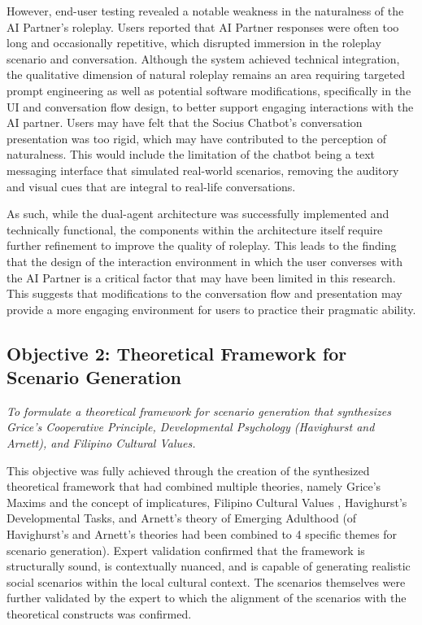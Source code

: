 However, end-user testing revealed a notable weakness in the naturalness of the
AI Partner's roleplay. Users reported that AI Partner responses were often too long
and occasionally repetitive, which disrupted immersion in the roleplay scenario and conversation. Although
the system achieved technical integration, the qualitative dimension of natural roleplay remains an 
area requiring targeted prompt engineering as well as potential software modifications, specifically in the UI and 
conversation flow design, to better support engaging interactions with the AI partner. Users may have felt that the Socius Chatbot's 
conversation presentation was too rigid, which may have contributed to the perception of naturalness. This would include the limitation of the chatbot being
a text messaging interface that simulated real-world scenarios, removing the auditory and visual cues that are integral to real-life conversations.

As such, while the dual-agent architecture was successfully implemented and technically functional, the components within the architecture itself require further refinement
to improve the quality of roleplay. This leads to the finding that the design of the interaction environment in which the user converses with the AI Partner is a critical factor that may have been limited
in this research. This suggests that modifications to the conversation flow and presentation may provide a more engaging environment for users to practice their pragmatic ability.

\subsection*{Objective 2: Theoretical Framework for Scenario Generation}

\textit{To formulate a theoretical framework for scenario generation that synthesizes
Grice's Cooperative Principle, Developmental Psychology (Havighurst and Arnett),
and Filipino Cultural Values.}

\medskip

This objective was fully achieved through the creation of the synthesized theoretical framework that had
combined multiple theories, namely Grice's Maxims and the concept of implicatures, Filipino Cultural Values 
\cite{jocano_filipino_1997}, Havighurst's Developmental Tasks, and Arnett's theory of Emerging Adulthood 
(of Havighurst's and Arnett's theories had been combined to 4 specific themes for scenario generation).
Expert validation confirmed that the framework is structurally sound, is contextually nuanced, and is capable of generating
realistic social scenarios within the local cultural context. The scenarios
themselves were further validated by the expert to which the alignment of the scenarios with the theoretical constructs was confirmed.


